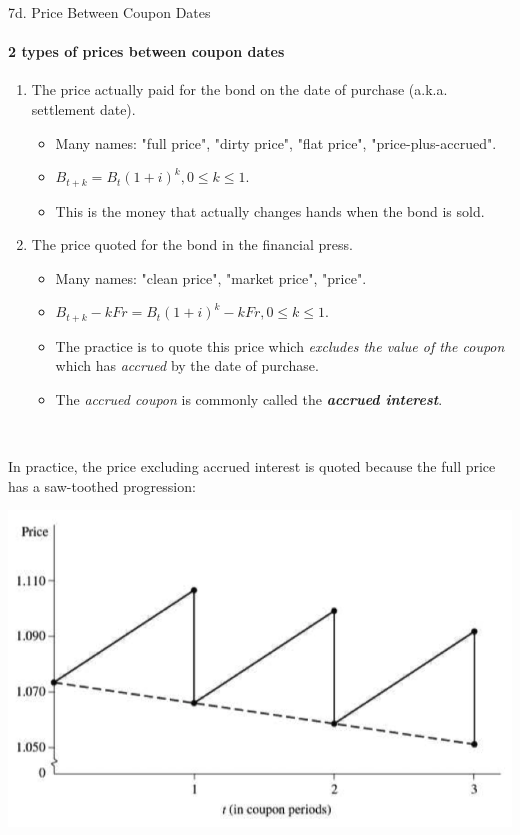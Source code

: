 \begin{CHPT_SUMM_AUTO}[label = {L.-7d}]{7d. Price Between Coupon Dates}
\paragraph*{2 types of prices between coupon dates}
\begin{enumerate}[leftmargin = *]
	\item	The price actually paid for the bond on the date of purchase (a.k.a. settlement date).
		\begin{itemize}[leftmargin = *]
		\item	Many names: "full price", "dirty price", "flat price", "price-plus-accrued".
		\item	$B_{t + k} = B_{t}(1 + i)^{k}, 0 \le k \le 1$.
		\item	This is the money that actually changes hands when the bond is sold.
		\end{itemize}
	\item	The price quoted for the bond in the financial press.
		\begin{itemize}[leftmargin = *]
		\item	Many names: "clean price", "market price", "price".
		\item	$B_{t + k} - kFr = B_{t}(1 + i)^{k} -kFr, 0 \le k \le 1$.
		\item	The practice is to quote this price which \textit{excludes the value of the coupon} which has \textit{accrued} by the date of purchase.
		\item	The \textit{accrued coupon} is commonly called the \textbf{\textit{accrued interest}}.
		\end{itemize}
\end{enumerate}

\

In practice, the price excluding accrued interest is quoted because the full price has a saw-toothed progression:
\begin{center}
	\includegraphics[scale=0.4]{img/BONDS-MRKTPRICE.png}
\end{center}


\end{CHPT_SUMM_AUTO}

